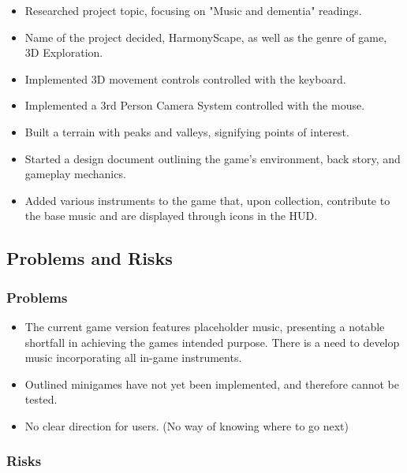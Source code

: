 \documentclass{article}
\begin{document}
\begin{itemize}
  \item Researched project topic, focusing on "Music and dementia" readings.
  \item Name of the project decided, HarmonyScape, as well as the genre of game, 3D Exploration.
  \item Implemented 3D movement controls controlled with the keyboard.
  \item Implemented a 3rd Person Camera System controlled with the mouse.
  \item Built a terrain with peaks and valleys, signifying points of interest.
  \item Started a design document outlining the game's environment, back story, and gameplay mechanics.
  \item Added various instruments to the game that, upon collection, contribute to the base music and are displayed through icons in the HUD.
\end{itemize}

\subsection{Problems and Risks}

\subsubsection{Problems}

\begin{itemize}
  \item The current game version features placeholder music, presenting a notable shortfall in achieving the games intended purpose. There is a need to develop music incorporating all in-game instruments.
  \item Outlined minigames have not yet been implemented, and therefore cannot be tested.
  \item No clear direction for users. (No way of knowing where to go next)
\end{itemize}

\subsubsection{Risks}
\end{document}
